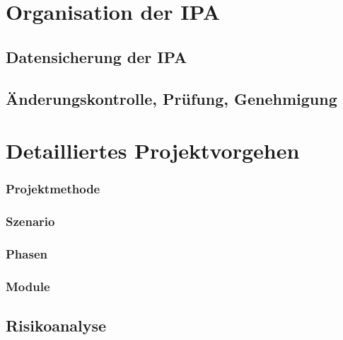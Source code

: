 \documentclass{report}
\begin{document}
\chapter{Organisation der IPA}
\section{Datensicherung der IPA}
\section{Änderungskontrolle, Prüfung, Genehmigung}

\chapter{Detailliertes Projektvorgehen}
\subsection{Projektmethode}
\subsection{Szenario}
\subsection{Phasen}
\subsection{Module}

\section{Risikoanalyse}
\end{document}
